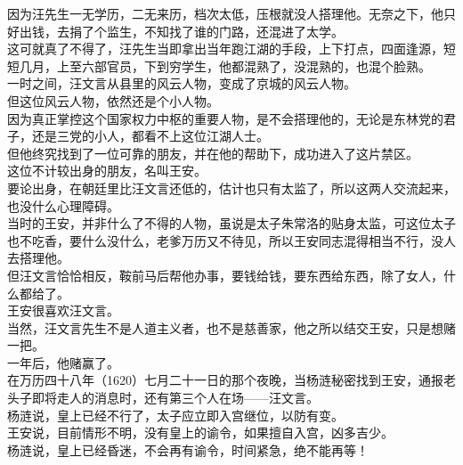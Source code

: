 \begin{multicols}{\theparacolNo}
因为汪先生一无学历，二无来历，档次太低，压根就没人搭理他。无奈之下，他只好出钱，去捐了个监生，不知找了谁的门路，还混进了太学。\\

这可就真了不得了，汪先生当即拿出当年跑江湖的手段，上下打点，四面逢源，短短几月，上至六部官员，下到穷学生，他都混熟了，没混熟的，也混个脸熟。\\

一时之间，汪文言从县里的风云人物，变成了京城的风云人物。\\

但这位风云人物，依然还是个小人物。\\

因为真正掌控这个国家权力中枢的重要人物，是不会搭理他的，无论是东林党的君子，还是三党的小人，都看不上这位江湖人士。\\

但他终究找到了一位可靠的朋友，并在他的帮助下，成功进入了这片禁区。\\

这位不计较出身的朋友，名叫王安。\\

要论出身，在朝廷里比汪文言还低的，估计也只有太监了，所以这两人交流起来，也没什么心理障碍。\\

当时的王安，并非什么了不得的人物，虽说是太子朱常洛的贴身太监，可这位太子也不吃香，要什么没什么，老爹万历又不待见，所以王安同志混得相当不行，没人去搭理他。\\

但汪文言恰恰相反，鞍前马后帮他办事，要钱给钱，要东西给东西，除了女人，什么都给了。\\

王安很喜欢汪文言。\\

当然，汪文言先生不是人道主义者，也不是慈善家，他之所以结交王安，只是想赌一把。\\

一年后，他赌赢了。\\

在万历四十八年（1620）七月二十一日的那个夜晚，当杨涟秘密找到王安，通报老头子即将走人的消息时，还有第三个人在场——汪文言。\\

杨涟说，皇上已经不行了，太子应立即入宫继位，以防有变。\\

王安说，目前情形不明，没有皇上的谕令，如果擅自入宫，凶多吉少。\\

杨涟说，皇上已经昏迷，不会再有谕令，时间紧急，绝不能再等！\\


\end{multicols}
